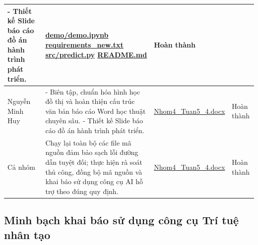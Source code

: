 \documentclass[conference,10pt,a4paper]{IEEEtran}
\begin{document}
\begin{table}[t]
\begin{tabularx}{\textwidth}{|>{\centering\arraybackslash}p{2.5cm}|X|X|>{\centering\arraybackslash}p{1.8cm}|}
- Thiết kế Slide báo cáo đồ án hành trình phát triển. & 
\url{demo/demo.ipynb} \newline
\url{requirements_new.txt} \newline
\url{src/predict.py} \newline
\url{README.md} & 
Hoàn thành \\
\hline
Nguyễn Minh Huy & 
- Biên tập, chuẩn hóa hình học đồ thị và hoàn thiện cấu trúc văn bản báo cáo Word học thuật chuyên sâu. \newline
- Thiết kế Slide báo cáo đồ án hành trình phát triển. & 
\url{Nhom4_Tuan5_4.docx} & 
Hoàn thành \\
\hline
Cả nhóm & 
Chạy lại toàn bộ các file mã nguồn đảm bảo sạch lỗi đường dẫn tuyệt đối; thực hiện rà soát thủ công, đồng bộ mã nguồn và khai báo sử dụng công cụ AI hỗ trợ theo đúng quy định. & 
\url{Nhom4_Tuan5_4.docx} & 
Hoàn thành \\
\hline
\end{tabularx}
\end{table}

\subsection{Minh bạch khai báo sử dụng công cụ Trí tuệ nhân tạo}
\end{document}

